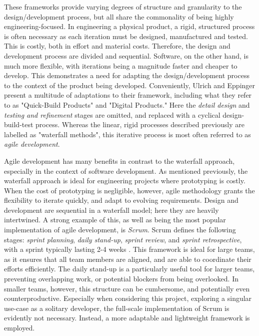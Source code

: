 These frameworks provide varying degrees of structure and granularity to the design/development process, but all share the commonality of being highly engineering-focused. In engineering a physical product, a rigid, structured process is often necessary as each iteration must be designed, manufactured and tested. This is costly, both in effort and material costs. Therefore, the design and development process are divided and sequential. Software, on the other hand, is much more flexible, with iterations being a magnitude faster and cheaper to develop. This demonstrates a need for adapting the design/development process to the context of the product being developed. Conveniently, Ulrich and Eppinger present a multitude of adaptations to their framework, including what they refer to as "Quick-Build Products" and "Digital Products." Here the \textit{detail design} and \textit{testing and refinement} stages are omitted, and replaced with a cyclical design-build-test process. Whereas the linear, rigid processes described previously are labelled as "waterfall methods", this iterative process is most often referred to as \textit{agile development}.

Agile development has many benefits in contrast to the waterfall approach, especially in the context of software development. As mentioned previously, the waterfall approach is ideal for engineering projects where prototyping is costly. When the cost of prototyping is negligible, however, agile methodology grants the flexibility to iterate quickly, and adapt to evolving requirements. Design and development are sequential in a waterfall model; here they are heavily intertwined. A strong example of this, as well as being the most popular implementation of agile development, is \textit{Scrum}. Scrum defines the following stages: \textit{sprint planning}, \textit{daily stand-up}, \textit{sprint review}, and \textit{sprint retrospective}, with a sprint typically lasting 2-4 weeks \cite{scrum}. This framework is ideal for large teams, as it ensures that all team members are aligned, and are able to coordinate their efforts efficiently. The daily stand-up is a particularly useful tool for larger teams, preventing overlapping work, or potential blockers from being overlooked. In smaller teams, however, this structure can be cumbersome, and potentially even counterproductive. Especially when considering this project, exploring a singular use-case as a solitary developer, the full-scale implementation of Scrum is evidently not necessary. Instead, a more adaptable and lightweight framework is employed.

